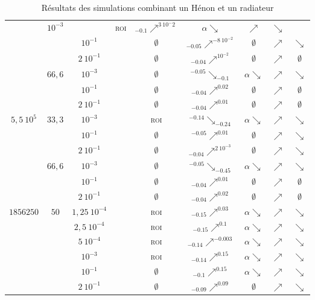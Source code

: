 \begin{table}[htbp]
\begin{tabular}{|c|c|c|c|c|c|c|c|c|}
					& $10^{-3}$ & \accretionlot{} & \textsc{roi} & ${}_{-0.1}\nearrow^{3\ 10^-2}$ & $\alpha\searrow$ & $\nearrow$ & $\searrow$ \tabularnewline \cline{3-9}
					& & $10^{-1}$ & \accretionpeu{} & $\emptyset$ & ${}_{-0.05}\nearrow^{-8\ 10^{-2}}$ & $\emptyset$ & $\nearrow$ & $\searrow$ \tabularnewline \cline{3-9}
					& & $2\ 10^{-1}$ & \accretionpeu{} & $\emptyset$ & ${}_{-0.04}\nearrow^{10^{-2}}$ & $\emptyset$ & $\nearrow$ & $\emptyset$ \tabularnewline \cline{2-9}
				& \multirow{3}{*}{$66,6$}
					& $10^{-3}$ & \accretionpeu{} & $\emptyset$ & ${}^{-0.05}\searrow_{-0.1}$ & $\alpha\searrow$ & $\nearrow$ & $\searrow$ \tabularnewline \cline{3-9}
					& & $10^{-1}$ & \accretionpeu{} & $\emptyset$ & ${}_{-0.04}\nearrow^{0.02}$ & $\emptyset$ & $\nearrow$ & $\emptyset$ \tabularnewline \cline{3-9}
					& & $2\ 10^{-1}$ & \accretionpeu{} & $\emptyset$ & ${}_{-0.04}\nearrow^{0.01}$ & $\emptyset$ & $\nearrow$ & $\emptyset$ \tabularnewline \cline{2-9}
			\hline
			\hline \multirow{6}{*}{$5,5\ 10^5$} & \multirow{3}{*}{$33,3$}
					& $10^{-3}$ & \accretionlot{} & \textsc{roi} & ${}^{-0.14}\searrow_{-0.24}$ & $\alpha\searrow$ & $\nearrow$ & $\searrow$ \tabularnewline \cline{3-9}
					& & $10^{-1}$ & \accretionlot{} & $\emptyset$ & ${}^{-0.05}\nearrow^{0.01}$ & $\emptyset$ & $\nearrow$ & $\searrow$ \tabularnewline \cline{3-9}
					& & $2\ 10^{-1}$ & \accretionpeu{} & $\emptyset$ & ${}_{-0.04}\nearrow^{2\ 10^{-3}}$ & $\emptyset$ & $\nearrow$ & $\searrow$ \tabularnewline \cline{2-9}
				& \multirow{3}{*}{$66,6$}
					& $10^{-3}$ & \accretionmoyen{} & $\emptyset$ & ${}^{-0.05}\searrow_{-0.45}$ & $\alpha\searrow$ & $\nearrow$ & $\searrow$ \tabularnewline \cline{3-9}
					& & $10^{-1}$ & \accretionpeu{} & $\emptyset$ & ${}_{-0.04}\nearrow^{0.01}$ & $\emptyset$ & $\nearrow$ & $\emptyset$ \tabularnewline \cline{3-9}
					& & $2\ 10^{-1}$ & \accretionpeu{} & $\emptyset$ & ${}_{-0.04}\nearrow^{0.02}$ & $\emptyset$ & $\nearrow$ & $\emptyset$ \tabularnewline \cline{2-9}
			\hline
			\hline \multirow{6}{*}{$1856250$} & \multirow{6}{*}{$50$}
					& $1,25\ 10^{-4}$ & \accretionlot{} & \textsc{roi} & ${}_{-0.15}\nearrow^{0.03}$ & $\alpha\searrow$ & $\nearrow$ & $\searrow$ \tabularnewline \cline{3-9}
					& & $2,5\ 10^{-4}$ & \accretionlot{} & \textsc{roi} & ${}_{-0.15}\nearrow^{0.1}$ & $\alpha\searrow$ & $\nearrow$ & $\searrow$ \tabularnewline \cline{3-9}
					& & $5\ 10^{-4}$ & \accretionlot{} & \textsc{roi} & ${}_{-0.14}\nearrow^{-0.003}$ & $\alpha\searrow$ & $\nearrow$ & $\searrow$ \tabularnewline \cline{3-9}
					& & $10^{-3}$ & \accretionlot{} & \textsc{roi} & ${}_{-0.14}\nearrow^{0.15}$ & $\alpha\searrow$ & $\nearrow$ & $\searrow$ \tabularnewline \cline{3-9}
					& & $10^{-1}$ & \accretionlot{} & $\emptyset$ & ${}_{-0.1}\nearrow^{0.15}$ & $\alpha\searrow$ & $\nearrow$ & $\searrow$ \tabularnewline \cline{3-9}
					& & $2\ 10^{-1}$ & \accretionlot{} & $\emptyset$ & ${}_{-0.09}\nearrow^{0.09}$ & $\emptyset$ & $\nearrow$ & $\searrow$ \tabularnewline \cline{2-9}
			\hline
		\end{tabular}
	\caption{Résultats des simulations combinant un Hénon et un radiateur\label{Tab::SimuZoomRes}}
\end{table}

